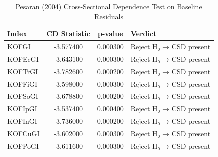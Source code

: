 \begin{table}[htbp]
\caption{Pesaran (2004) Cross-Sectional Dependence Test on Baseline Residuals}
\label{tab:residual_cd_test}
\begin{tabular}{lccl}
\toprule
Index & CD Statistic & p-value & Verdict \\
\midrule
KOFGI & -3.577400 & 0.000300 & Reject H₀ → CSD present \\
KOFEcGI & -3.643100 & 0.000300 & Reject H₀ → CSD present \\
KOFTrGI & -3.782600 & 0.000200 & Reject H₀ → CSD present \\
KOFFiGI & -3.598000 & 0.000300 & Reject H₀ → CSD present \\
KOFSoGI & -3.678800 & 0.000200 & Reject H₀ → CSD present \\
KOFIpGI & -3.537400 & 0.000400 & Reject H₀ → CSD present \\
KOFInGI & -3.736000 & 0.000200 & Reject H₀ → CSD present \\
KOFCuGI & -3.602000 & 0.000300 & Reject H₀ → CSD present \\
KOFPoGI & -3.611600 & 0.000300 & Reject H₀ → CSD present \\
\bottomrule
\end{tabular}
\end{table}
